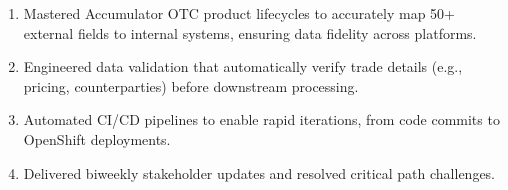 \documentclass[a4paper,11pt]{article}
\begin{document}
\begin{itemize}[itemsep=-5pt]
\begin{enumerate}[itemsep=-5pt]
			\item{Mastered Accumulator OTC product lifecycles to accurately map 50+ external fields to internal systems, ensuring data fidelity across platforms.}
			\item{Engineered data validation that automatically verify trade details (e.g., pricing, counterparties) before downstream processing.}
			\item{Automated CI/CD pipelines to enable rapid iterations, from code commits to OpenShift deployments.}
			\item{Delivered biweekly stakeholder updates and resolved critical path challenges.}
		\end{enumerate}
	\end{itemize}
	\vspace{-0.2 cm}
	\hdashrule{\textwidth}{0.5pt}{2pt}
	
\end{document}
